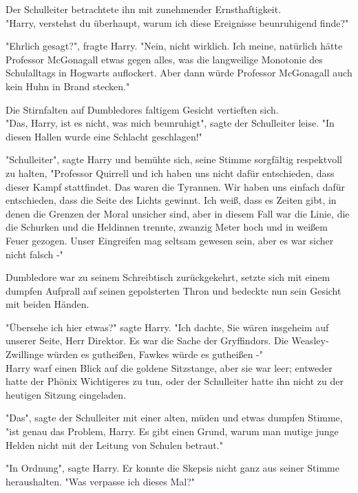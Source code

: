 {Der Schulleiter betrachtete ihn mit zunehmender Ernsthaftigkeit.\\ "Harry, verstehst du überhaupt, warum ich diese Ereignisse beunruhigend finde?"

"Ehrlich gesagt?", fragte Harry. "Nein, nicht wirklich. Ich meine, natürlich hätte Professor McGonagall etwas gegen alles, was die langweilige Monotonie des Schulalltags in Hogwarts auflockert. Aber dann würde Professor McGonagall auch kein Huhn in Brand stecken."

Die Stirnfalten auf Dumbledores faltigem Gesicht vertieften sich.\\ "Das, Harry, ist es nicht, was mich beunruhigt", sagte der Schulleiter leise. "In diesen Hallen wurde eine Schlacht geschlagen!"

"Schulleiter", sagte Harry und bemühte sich, seine Stimme sorgfältig respektvoll zu halten, "Professor Quirrell und ich haben uns nicht dafür entschieden, dass dieser Kampf stattfindet. Das waren die Tyrannen. Wir haben uns einfach dafür entschieden, dass die Seite des Lichts gewinnt. Ich weiß, dass es Zeiten gibt, in denen die Grenzen der Moral unsicher sind, aber in diesem Fall war die Linie, die die Schurken und die Heldinnen trennte, zwanzig Meter hoch und in weißem Feuer gezogen. Unser Eingreifen mag seltsam gewesen sein, aber es war sicher nicht falsch -"

Dumbledore war zu seinem Schreibtisch zurückgekehrt, setzte sich mit einem dumpfen Aufprall auf seinen gepolsterten Thron und bedeckte nun sein Gesicht mit beiden Händen.

"Übersehe ich hier etwas?" sagte Harry. "Ich dachte, Sie wären insgeheim auf unserer Seite, Herr Direktor. Es war die Sache der Gryffindors. Die Weasley-Zwillinge würden es gutheißen, Fawkes würde es gutheißen -"\\ Harry warf einen Blick auf die goldene Sitzstange, aber sie war leer; entweder hatte der Phönix Wichtigeres zu tun, oder der Schulleiter hatte ihn nicht zu der heutigen Sitzung eingeladen.

"Das", sagte der Schulleiter mit einer alten, müden und etwas dumpfen Stimme, "ist genau das Problem, Harry. Es gibt einen Grund, warum man mutige junge Helden nicht mit der Leitung von Schulen betraut."

"In Ordnung", sagte Harry. Er konnte die Skepsis nicht ganz aus seiner Stimme heraushalten. "Was verpasse ich dieses Mal?"

}
